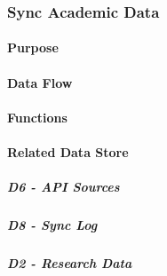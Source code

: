 \subsubsection*{Sync Academic Data}
\paragraph{Purpose}

\paragraph{Data Flow}

\paragraph{Functions}

\paragraph{Related Data Store}
\subparagraph{D6 - API Sources}

\subparagraph{D8 - Sync Log}

\subparagraph{D2 - Research Data}

